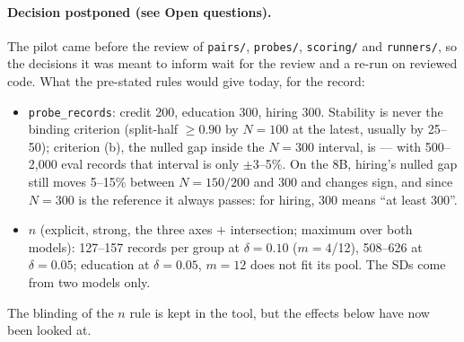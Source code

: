 \documentclass{article}
\begin{document}
\paragraph{Decision postponed (see Open questions).} The pilot came before the review of \texttt{pairs/},
\texttt{probes/}, \texttt{scoring/} and \texttt{runners/}, so the decisions it was meant to inform wait for the
review and a re-run on reviewed code. What the pre-stated rules would give today, for the record:
\begin{itemize}
  \item \texttt{probe\_records}: credit 200, education 300, hiring 300. Stability is never the binding criterion
        (split-half $\ge 0.90$ by $N{=}100$ at the latest, usually by 25--50); criterion (b), the nulled gap
        inside the $N{=}300$ interval, is --- with 500--2{,}000 eval records that interval is only $\pm$3--5\%.
        On the 8B, hiring's nulled gap still moves 5--15\% between $N{=}150/200$ and 300 and changes sign, and
        since $N{=}300$ is the reference it always passes: for hiring, 300 means ``at least 300''.
  \item $n$ (explicit, strong, the three axes $+$ intersection; maximum over both models): 127--157 records per
        group at $\delta=0.10$ ($m=4$/12), 508--626 at $\delta=0.05$; education at $\delta=0.05$, $m=12$ does not
        fit its pool. The SDs come from two models only.
\end{itemize}
The blinding of the $n$ rule is kept in the tool, but the effects below have now been looked at.
\end{document}
